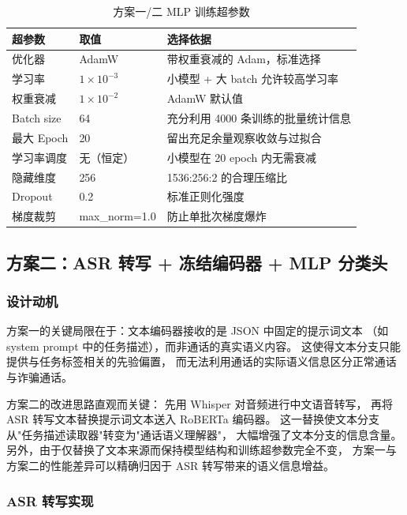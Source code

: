 \documentclass[11pt,a4paper]{ctexart}
\begin{document}
\begin{table}[H]\centering
\caption{方案一/二 MLP 训练超参数}
\label{tab:mlp}
\begin{tabular}{@{}lll@{}}\toprule
\textbf{超参数} & \textbf{取值} & \textbf{选择依据}\\\midrule
优化器 & AdamW & 带权重衰减的 Adam，标准选择\\
学习率 & $1 \times 10^{-3}$ & 小模型 + 大 batch 允许较高学习率\\
权重衰减 & $1 \times 10^{-2}$ & AdamW 默认值\\
Batch size & 64 & 充分利用 4000 条训练的批量统计信息\\
最大 Epoch & 20 & 留出充足余量观察收敛与过拟合\\
学习率调度 & 无（恒定） & 小模型在 20 epoch 内无需衰减\\
隐藏维度 & 256 & 1536:256:2 的合理压缩比\\
Dropout & 0.2 & 标准正则化强度\\
梯度裁剪 & max\_norm=1.0 & 防止单批次梯度爆炸\\\bottomrule
\end{tabular}
\end{table}

\subsection{方案二：ASR 转写 + 冻结编码器 + MLP 分类头}

\subsubsection{设计动机}

方案一的关键局限在于：文本编码器接收的是 JSON 中固定的提示词文本
（如 system prompt 中的任务描述），而非通话的真实语义内容。
这使得文本分支只能提供与任务标签相关的先验偏置，
而无法利用通话的实际语义信息区分正常通话与诈骗通话。

方案二的改进思路直观而关键：
先用 Whisper 对音频进行中文语音转写，
再将 ASR 转写文本替换提示词文本送入 RoBERTa 编码器。
这一替换使文本分支从"任务描述读取器"转变为"通话语义理解器"，
大幅增强了文本分支的信息含量。
另外，由于仅替换了文本来源而保持模型结构和训练超参数完全不变，
方案一与方案二的性能差异可以精确归因于 ASR 转写带来的语义信息增益。

\subsubsection{ASR 转写实现}
\end{document}
